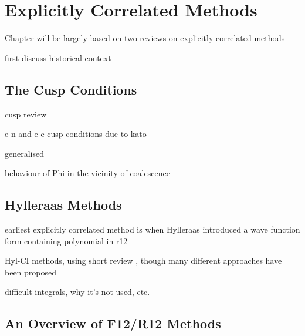 \chapter{Explicitly Correlated Methods}
\label{chap:explicit}

Chapter will be largely based on two reviews on explicitly correlated methods \cite{gruneisPerspective2017,hattigExplicitly2012}

first discuss historical context

\section{The Cusp Conditions}
\label{sec:cusp}

cusp review \cite{kurokawaChapterTwoGeneral2016}

e-n and e-e cusp conditions due to kato\cite{katoEigenfunctionsManyparticleSystems1957a}

generalised \cite{packCuspConditionsMolecular1966}

behaviour of Phi in the vicinity of coalescence



\section{Hylleraas Methods}

earliest explicitly correlated method is when Hylleraas introduced a wave function form containing polynomial in r12


Hyl-CI methods, using short review \cite{largo-cabrerizoHylleraasCI1987}, though many different approaches have been proposed
\cite{jamesGround1933,kol/osAccurate1964,perkinsAtomic1968,perkinsAtomic1969,simsCombined1971,simsOneCenter1971,claryHylleraastype1977,claryCIHylleraas1976}

difficult integrals, why it's not used, etc.


\section{An Overview of F12/R12 Methods}


